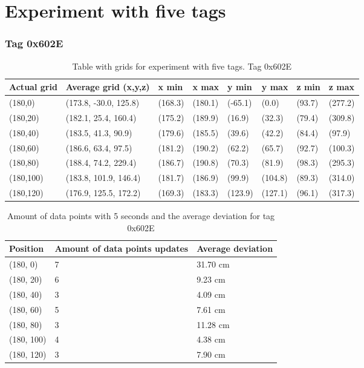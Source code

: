 \section{Experiment with five tags}

\subsubsection{Tag 0x602E}
\begin{table}[H]
    \begin{tabular}{|l|l|l|l|l|l|l|l|}
        \hline
        Actual grid & Average grid (x,y,z)  & x min   & x max   & y min   & y max   & z min  & z max   \\ \hline
        (180,0)     & (173.8, -30.0, 125.8) & (168.3) & (180.1) & (-65.1) & (0.0)   & (93.7) & (277.2) \\ \hline
        (180,20)    & (182.1, 25.4, 160.4)  & (175.2) & (189.9) & (16.9)  & (32.3)  & (79.4) & (309.8) \\ \hline
        (180,40)    & (183.5, 41.3, 90.9)   & (179.6) & (185.5) & (39.6)  & (42.2)  & (84.4) & (97.9)  \\ \hline
        (180,60)    & (186.6, 63.4, 97.5)   & (181.2) & (190.2) & (62.2)  & (65.7)  & (92.7) & (100.3) \\ \hline
        (180,80)    & (188.4, 74.2, 229.4)  & (186.7) & (190.8) & (70.3)  & (81.9)  & (98.3) & (295.3) \\ \hline
        (180,100)   & (183.8, 101.9, 146.4) & (181.7) & (186.9) & (99.9)  & (104.8) & (89.3) & (314.0) \\ \hline
        (180,120)   & (176.9, 125.5, 172.2) & (169.3) & (183.3) & (123.9) & (127.1) & (96.1) & (317.3) \\ \hline
    \end{tabular}
    \caption{Table with grids for experiment with five tags. Tag 0x602E}
\end{table}

\begin{table}[H]
    \centering
    \begin{tabular}{|l|l|l|}
        \hline
        Position   & Amount of data points updates & Average deviation \\ \hline
        (180, 0)   & 7                             & 31.70 cm          \\ \hline
        (180, 20)  & 6                             & 9.23 cm           \\ \hline
        (180, 40)  & 3                             & 4.09 cm           \\ \hline
        (180, 60)  & 5                             & 7.61 cm           \\ \hline
        (180, 80)  & 3                             & 11.28 cm          \\ \hline
        (180, 100) & 4                             & 4.38 cm           \\ \hline
        (180, 120) & 3                             & 7.90 cm           \\ \hline
    \end{tabular}
    \caption{Amount of data points with 5 seconds and the average deviation for tag 0x602E}
\end{table}

